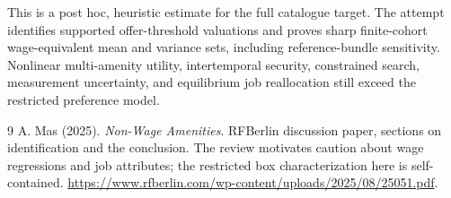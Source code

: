 \documentclass[11pt,a4paper]{article}
\begin{document}
This is a post hoc, heuristic estimate for the full catalogue target.
The attempt identifies supported offer-threshold valuations and proves sharp finite-cohort wage-equivalent mean and variance sets, including reference-bundle sensitivity. Nonlinear multi-amenity utility, intertemporal security, constrained search, measurement uncertainty, and equilibrium job reallocation still exceed the restricted preference model.

\begin{thebibliography}{9}
 A. Mas (2025). \emph{Non-Wage Amenities}.
RFBerlin discussion paper, sections on identification and the conclusion.
The review motivates caution about wage regressions and job attributes; the restricted box characterization here is self-contained.
\url{https://www.rfberlin.com/wp-content/uploads/2025/08/25051.pdf}.
\end{thebibliography}
\end{document}
